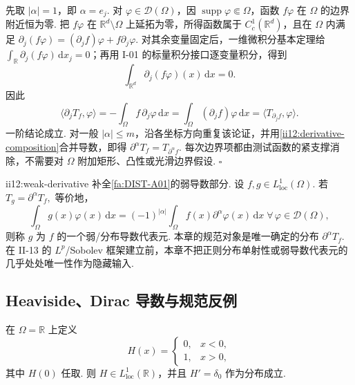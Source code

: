 \begin{FAProof}
先取 \(\displaystyle|\alpha|=1\)，即 \(\displaystyle\alpha=e_j\). 对 \(\displaystyle\varphi\in\mathcal D(\Omega)\)，因 \(\displaystyle\operatorname{supp}\varphi\Subset\Omega\)，函数 \(\displaystyle f\varphi\) 在 \(\displaystyle\Omega\) 的边界附近恒为零. 把 \(\displaystyle f\varphi\) 在 \(\displaystyle\mathbb R^d\setminus\Omega\) 上延拓为零，所得函数属于 \(\displaystyle C_c^1(\mathbb R^d)\)，且在 \(\displaystyle\Omega\) 内满足 \(\displaystyle \partial_j(f\varphi) = (\partial_jf)\varphi+f\partial_j\varphi.\)
对其余变量固定后，一维微积分基本定理给 \(\displaystyle\int_{\mathbb R}\partial_j(f\varphi)\,\mathrm{d}x_j=0\)；再用 I-01 的标量积分接口逐变量积分，得到
\[
\int_{\mathbb R^d}\partial_j(f\varphi)(x)\,\mathrm{d}x=0.
\]
因此
\[
\langle\partial_jT_f,\varphi\rangle
=
-\int_\Omega f\,\partial_j\varphi\,\mathrm{d}x
=
\int_\Omega(\partial_jf)\varphi\,\mathrm{d}x
=
\langle T_{\partial_jf},\varphi\rangle.
\]
一阶结论成立. 对一般 \(\displaystyle|\alpha|\leqslant m\)，沿各坐标方向重复该论证，并用\autoref{ii12:derivative-composition}合并导数，即得 \(\displaystyle \partial^\alpha T_f=T_{\partial^\alpha f}.\)
每次边界项都由测试函数的紧支撑消除，不需要对 \(\displaystyle\Omega\) 附加矩形、凸性或光滑边界假设.
\hfill\(\square\)
\end{FAProof}

\begin{FADefinition}[B][弱导数代表元]{ii12:weak-derivative}
补全\autoref{fa:DIST-A01}的弱导数部分. 设 \(\displaystyle f,g\in L^1_{\mathrm{loc}}(\Omega)\). 若 \(\displaystyle T_g=\partial^\alpha T_f,\)
等价地，
\[
\int_\Omega g(x)\varphi(x)\,\mathrm{d}x
=
(-1)^{|\alpha|}
\int_\Omega f(x)\partial^\alpha\varphi(x)\,\mathrm{d}x
\;
\forall\,\varphi\in\mathcal D(\Omega),
\]
则称 \(\displaystyle g\) 为 \(\displaystyle f\) 的一个弱/分布导数代表元. 本章的规范对象是唯一确定的分布 \(\displaystyle\partial^\alpha T_f\). 在 II-13 的 \(\displaystyle L^p\)/Sobolev 框架建立前，本章不把正则分布单射性或弱导数代表元的几乎处处唯一性作为隐藏输入.
\end{FADefinition}

\subsection{Heaviside、Dirac 导数与规范反例}

\begin{FAExample}[Heaviside的分布导数]
在 \(\displaystyle\Omega=\mathbb R\) 上定义
\[
H(x)
=
\begin{cases}
0,&x<0,\\
1,&x>0,
\end{cases}
\]
其中 \(\displaystyle H(0)\) 任取. 则 \(\displaystyle H\in L^1_{\mathrm{loc}}(\mathbb R)\)，并且 \(\displaystyle H'=\delta_0\)
作为分布成立.
\end{FAExample}

